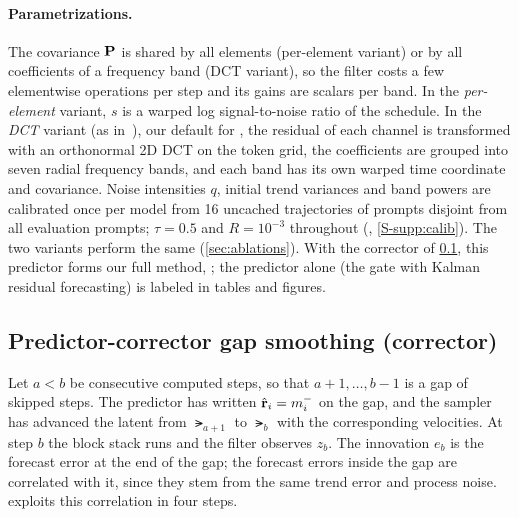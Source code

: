 \paragraph{Parametrizations.}
The covariance $\mathbf{P}$ is shared by all elements (per-element variant) or by all coefficients of a frequency band (DCT
variant), so the filter costs a few elementwise operations per step and its gains are scalars per band. In the
\emph{per-element} variant, $s$ is a warped log signal-to-noise ratio of the schedule. In the
\emph{DCT} variant (as in~\cite{rajabi2026speckcast}), our default for \flux, the residual of each channel is transformed
with an orthonormal 2D DCT on the token grid, the coefficients are grouped into seven radial frequency bands, and each
band has its own warped time coordinate and covariance. Noise intensities $q$, initial trend variances and band powers
are calibrated once per model from 16 uncached trajectories of prompts disjoint from all evaluation prompts; $\tau=0.5$
and $R=10^{-3}$ throughout (, \ref*{S-supp:calib}). The two variants perform the same (\cref{sec:ablations}). With the corrector of
\cref{sec:pcgs}, this predictor forms our full method, \ours; the predictor alone (the \sea gate with Kalman residual
forecasting) is labeled \kalsea in tables and figures.

\subsection{Predictor-corrector gap smoothing (corrector)}
\label{sec:pcgs}

Let $a<b$ be consecutive computed steps, so that $a{+}1,\dots,b{-}1$ is a gap of skipped steps. The predictor has
written $\hat{\mathbf{r}}_i=m^{-}_i$ on the gap, and the sampler has advanced the latent from $\lat_{a+1}$ to $\lat_b$
with the corresponding velocities. At step $b$ the block stack runs and the filter observes $z_b$. The innovation
$e_b$ is the forecast error at the end of the gap; the forecast errors inside the gap are correlated with it, since
they stem from the same trend error and process noise. \pcgs exploits this correlation in four steps.

